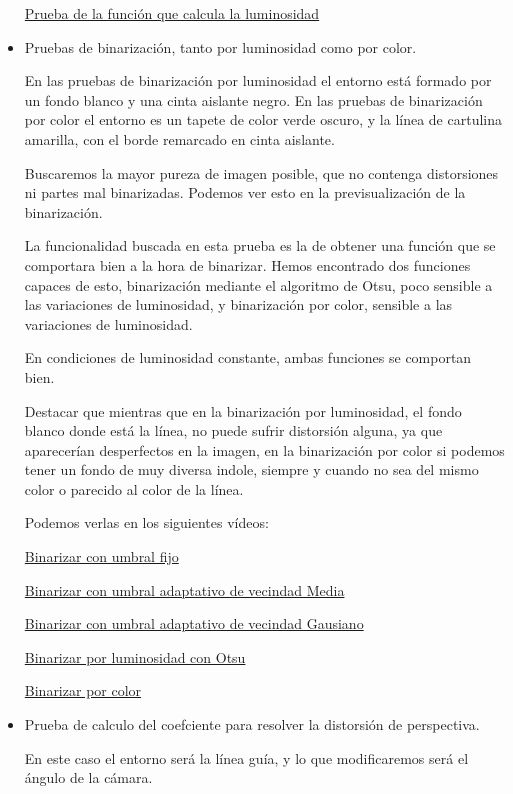 \begin{itemize}
	\href{https://youtu.be/CuTADdioU4g}{Prueba de la función que calcula la luminosidad}	
	
	\item Pruebas de binarización, tanto por luminosidad como por color. 
	
	En las pruebas de binarización por luminosidad el entorno está formado por un fondo blanco y una cinta aislante negro.
En las pruebas de binarización por color el entorno es un tapete de color verde oscuro, y la línea de cartulina amarilla, con el borde remarcado en cinta aislante.

Buscaremos la mayor pureza de imagen posible, que no contenga
distorsiones ni partes mal binarizadas. Podemos ver esto en la previsualización de la binarización.

La funcionalidad buscada en esta prueba es la de obtener una función que se comportara bien a la hora de binarizar. Hemos encontrado dos funciones capaces de esto, binarización mediante el algoritmo de Otsu, poco sensible a las variaciones de luminosidad, y binarización por color, sensible a las variaciones de luminosidad.

En condiciones de luminosidad constante, ambas funciones se comportan bien.

Destacar que mientras que en la binarización por luminosidad, el fondo blanco donde está la línea, no puede sufrir distorsión alguna, ya que aparecerían desperfectos en la imagen, en la binarización por color si podemos tener un fondo de muy diversa indole, siempre y cuando no sea del mismo color o parecido al color de la línea.
	
	
	Podemos verlas en los siguientes vídeos:
	
	\href{https://youtu.be/Gu_HvPr3cCU}{Binarizar con umbral fijo}
	
	\href{https://youtu.be/NCWQ2I-1J_o}{Binarizar con umbral adaptativo de vecindad Media}
	
	\href{https://youtu.be/XPxqk3kNXKY}{Binarizar con umbral adaptativo de vecindad Gausiano}
	
	\href{https://youtu.be/4CW4r9qdo4Y}{Binarizar por luminosidad con Otsu}
	
	\href{https://youtu.be/Rks5PkxDeZQ}{Binarizar por color}
	
	\item Prueba de calculo del coefciente para resolver la distorsión de perspectiva. 
	
	En este caso el entorno será la línea guía, y lo que modificaremos será el ángulo de la cámara.
	

\end{itemize}
